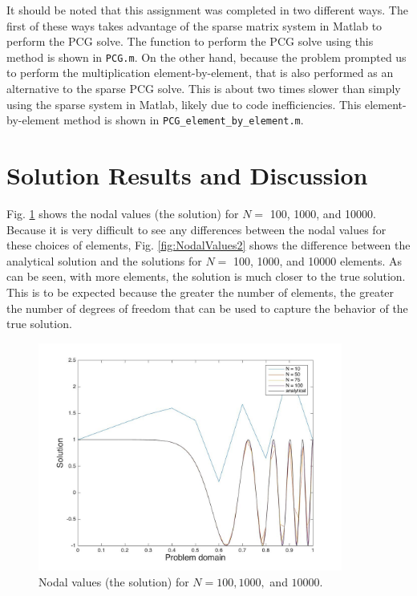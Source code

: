 \documentclass[10pt]{article}
\begin{document}
It should be noted that this assignment was completed in two different ways. The first of these ways takes advantage of the sparse matrix system in Matlab to perform the PCG solve. The function to perform the PCG solve using this method is shown in \texttt{PCG.m}. On the other hand, because the problem prompted us to perform the multiplication element-by-element, that is also performed as an alternative to the sparse PCG solve. This is about two times slower than simply using the sparse system in Matlab, likely due to code inefficiencies. This element-by-element method is shown in \texttt{PCG\_element\_by\_element.m}.

\section{Solution Results and Discussion}

Fig. \ref{fig:NodalValues} shows the nodal values (the solution) for \(N=\) 100, 1000, and 10000. Because it is very difficult to see any differences between the nodal values for these choices of elements, Fig. \ref{fig:NodalValues2} shows the difference between the analytical solution and the solutions for \(N=\) 100, 1000, and 10000 elements. As can be seen, with more elements, the solution is much closer to the true solution. This is to be expected because the greater the number of elements, the greater the number of degrees of freedom that can be used to capture the behavior of the true solution. 

\begin{figure}[H]
  \centering
  \includegraphics[width=10cm]{Nplot.jpg} %
  \caption{Nodal values (the solution) for \(N=100, 1000, \) and \(10000\).}
  \label{fig:NodalValues}
\end{figure}
\end{document}
